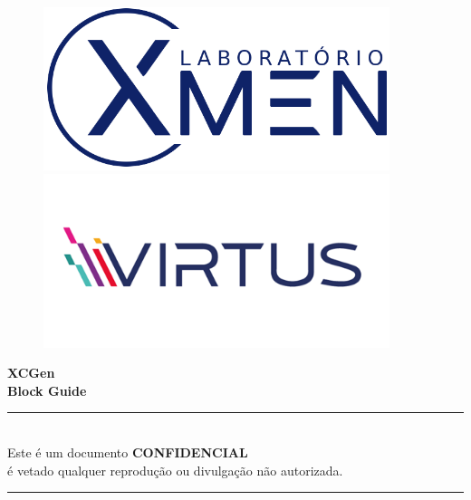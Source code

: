 \begin{titlepage}

\begin{figure}
\centering

\begin{minipage}{0.45\textwidth}
    \centering
    \includegraphics[width=0.9\textwidth]{images/logo.jpg}
\end{minipage}\hfill
\begin{minipage}{0.45\textwidth}
    \centering
    \includegraphics[width=0.9\textwidth]{images/logo_virtus.png}
\end{minipage}

\end{figure}

\vspace{8cm}
\parbox[t]{0.93\textwidth}{ 
\parbox[t]{0.91\textwidth}{
    \centering
    \fontsize{36pt}{40pt}\selectfont
    \vspace{3cm}
    
    \textbf{XCGen \\
    Block Guide}
    
    \vspace{1.5cm}}
}
\end{titlepage}

\pagebreak
\hspace{0pt}
\vfill
\begin{center}
\hfill\rule{\linewidth}{1pt} \\[4pt]
    Este é um documento \textbf{CONFIDENCIAL} \\
    é vetado qualquer reprodução ou divulgação não autorizada.\\[4pt]
    \hfill\rule{\linewidth}{1pt} \\[4pt]
\end{center}
\vfill
\hspace{0pt}
\pagebreak
